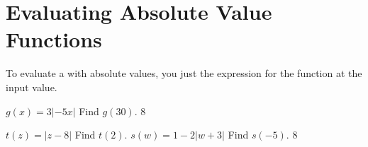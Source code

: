 \newpage
\section{Evaluating Absolute Value Functions}

\begin{tcolorbox}[center,width=6.5in,colback=white,]
    To evaluate a  with absolute values, 
    you just  the expression for the function 
    at the input value.
\end{tcolorbox}


{
    $
        g(x) =
        3|-5x|
    $
    \qquad
    Find $g(30)$.
}
{8\onelineskip}

\myProblems
{
    $
        t(z) =
        |z - 8|
    $
    \qquad
    Find $t(2)$.
}
{
    $
        s(w) =
        1 - 2\left|w + 3\right|
    $
    \qquad
    Find $s(-5)$.
}
{8\onelineskip}

